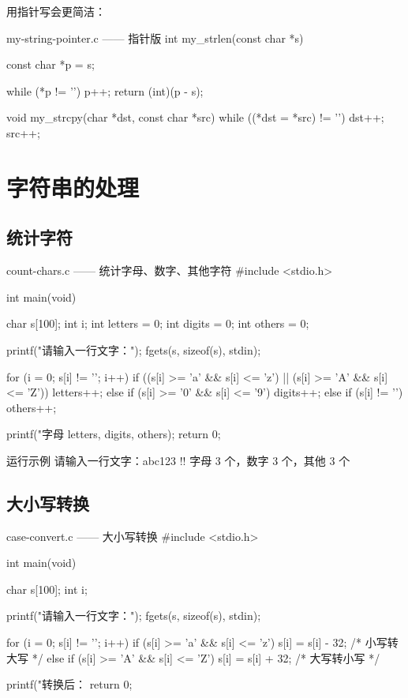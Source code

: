 用指针写会更简洁：

\begin{codebox}{my-string-pointer.c —— 指针版}
int my_strlen(const char *s)
{
    const char *p = s;

    while (*p != '\0') {
        p++;
    }
    return (int)(p - s);
}

void my_strcpy(char *dst, const char *src)
{
    while ((*dst = *src) != '\0') {
        dst++;
        src++;
    }
}
\end{codebox}

\section{字符串的处理}

\subsection{统计字符}

\begin{codebox}{count-chars.c —— 统计字母、数字、其他字符}
#include <stdio.h>

int main(void)
{
    char s[100];
    int i;
    int letters = 0;
    int digits = 0;
    int others = 0;

    printf("请输入一行文字：");
    fgets(s, sizeof(s), stdin);

    for (i = 0; s[i] != '\0'; i++) {
        if ((s[i] >= 'a' && s[i] <= 'z') || (s[i] >= 'A' && s[i] <= 'Z')) {
            letters++;
        } else if (s[i] >= '0' && s[i] <= '9') {
            digits++;
        } else if (s[i] != '\n') {
            others++;
        }
    }

    printf("字母 %
           letters, digits, others);
    return 0;
}
\end{codebox}

\begin{outbox}{运行示例}
请输入一行文字：abc123 !!
字母 3 个，数字 3 个，其他 3 个
\end{outbox}

\subsection{大小写转换}

\begin{codebox}{case-convert.c —— 大小写转换}
#include <stdio.h>

int main(void)
{
    char s[100];
    int i;

    printf("请输入一行文字：");
    fgets(s, sizeof(s), stdin);

    for (i = 0; s[i] != '\0'; i++) {
        if (s[i] >= 'a' && s[i] <= 'z') {
            s[i] = s[i] - 32;       /* 小写转大写 */
        } else if (s[i] >= 'A' && s[i] <= 'Z') {
            s[i] = s[i] + 32;       /* 大写转小写 */
        }
    }

    printf("转换后：%
    return 0;
}
\end{codebox}

